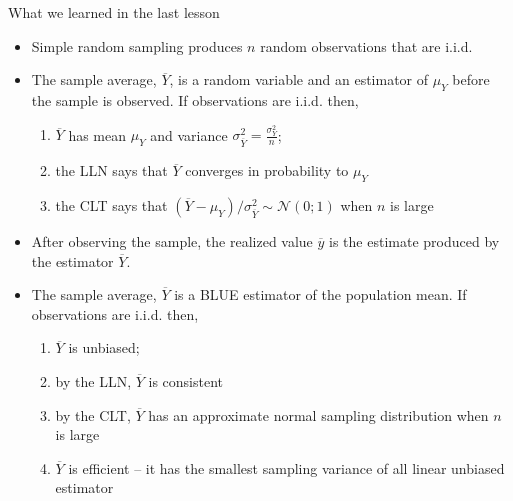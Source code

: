 \documentclass[notes,10pt, aspectratio=169]{beamer}
\begin{document}
\begin{frame}{What we learned in the last lesson}
\begin{itemize}
    \item Simple random sampling produces $n$ random observations that are i.i.d.
    \item The sample average, $\overline{Y}$, is a random variable and an estimator of $\mu_Y$ before the sample is observed. If observations are i.i.d. then,
    \begin{enumerate}
        \item $\overline{Y}$ has mean $\mu_Y$ and variance $\sigma^2_{\overline{Y}} = \frac{\sigma^2_Y}{n} $;
        \item the LLN says that $\overline{Y}$ converges in probability to  $\mu_Y$
        \item the CLT says that $(\overline{Y}-\mu_Y)/\sigma^2_{\overline{Y}} \sim \mathcal{N}(0;1)$ when $n$ is large
    \end{enumerate}
      \item After observing the sample, the realized value $\overline{y}$ is the estimate produced by the estimator $\overline{Y}$.
      \item The sample average, $\overline{Y}$ is a BLUE estimator of the population mean. If observations are i.i.d. then,
    \begin{enumerate}
        \item $\overline{Y}$ is unbiased;
        \item by the LLN, $\overline{Y}$ is consistent
        \item by the CLT, $\overline{Y}$ has an approximate normal sampling distribution when $n$ is large
        \item $\overline{Y}$ is efficient -- it has the smallest sampling variance of all linear unbiased estimator
    \end{enumerate}
\end{itemize}
\end{frame}
\end{document}
